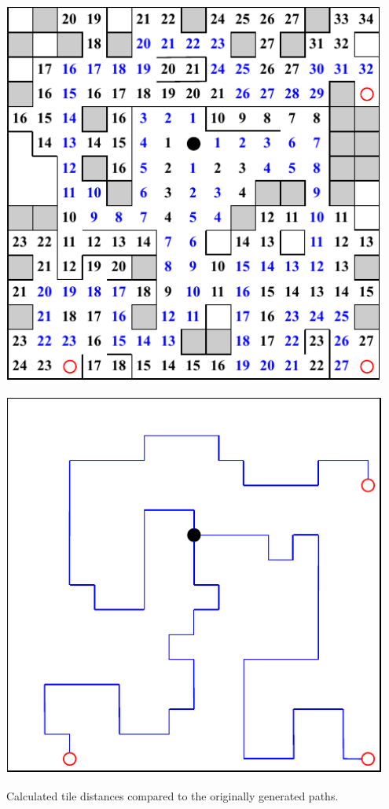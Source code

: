 \begin{center}
    \captionsetup{type=figure}
    \begin{minipage}{.5\textwidth}
        \centering
        \includegraphics[width=0.95\textwidth]{img/Path Distances.pdf}
    \end{minipage}%
    \begin{minipage}{.5\textwidth}
        \centering
        \includegraphics[width=0.95\textwidth]{img/Generated Paths.pdf}
    \end{minipage}
    \caption{Calculated tile distances compared to the originally generated paths.}
    \label{fig:path-distances}
\end{center}

